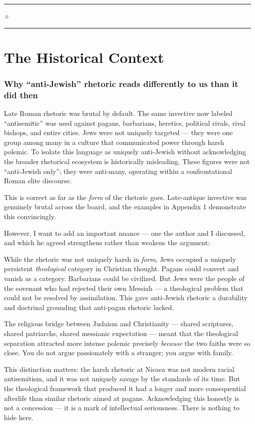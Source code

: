 \documentclass[10pt,twoside,openany]{book}
\newcommand{\ornrule}{%
  \par\bigskip
  {\noindent\hfil{\color{gold}\rule[0.5ex]{1.5in}{0.5pt}%
  \quad$\diamond$\quad%
  \rule[0.5ex]{1.5in}{0.5pt}}\hfil\par}%
  \bigskip
}
\begin{document}
\ornrule



\part{The Historical Context}



\section{Why ``anti-Jewish'' rhetoric reads differently to us than it did then}

Late Roman rhetoric was brutal by default. The same invective now
labeled ``antisemitic'' was used against pagans, barbarians, heretics,
political rivals, rival bishops, and entire cities. Jews were not
uniquely targeted --- they were one group among many in a culture that
communicated power through harsh polemic. To isolate this language as
uniquely anti-Jewish without acknowledging the broader rhetorical
ecosystem is historically misleading. These figures were not
``anti-Jewish only''; they were anti-many, operating within a
confrontational Roman elite discourse.

\begin{reviewerbox}
This is correct as far as the \emph{form} of the rhetoric
goes. Late-antique invective was genuinely brutal
across the board, and the examples in Appendix 1
demonstrate this convincingly.

However, I want to add an important nuance --- one the
author and I discussed, and which he agreed strengthens
rather than weakens the argument:

While the rhetoric was not uniquely harsh in \emph{form},
Jews occupied a uniquely persistent \emph{theological}
category in Christian thought. Pagans could convert and
vanish as a category. Barbarians could be civilized.
But Jews were the people of the covenant who had
rejected their own Messiah --- a theological problem that
could not be resolved by assimilation. This gave anti-Jewish rhetoric a durability and doctrinal grounding
that anti-pagan rhetoric lacked.

The religious bridge between Judaism and Christianity
--- shared scriptures, shared patriarchs, shared
messianic expectation --- meant that the theological
separation attracted more intense polemic precisely
\emph{because} the two faiths were so close. You do not
argue passionately with a stranger; you argue with
family.

This distinction matters: the harsh rhetoric at Nicaea
was not modern racial antisemitism, and it was not
uniquely savage by the standards of its time. But the
theological framework that produced it had a longer
and more consequential afterlife than similar rhetoric
aimed at pagans. Acknowledging this honestly is not a
concession --- it is a mark of intellectual seriousness.
There is nothing to hide here.
\end{reviewerbox}
\end{document}
